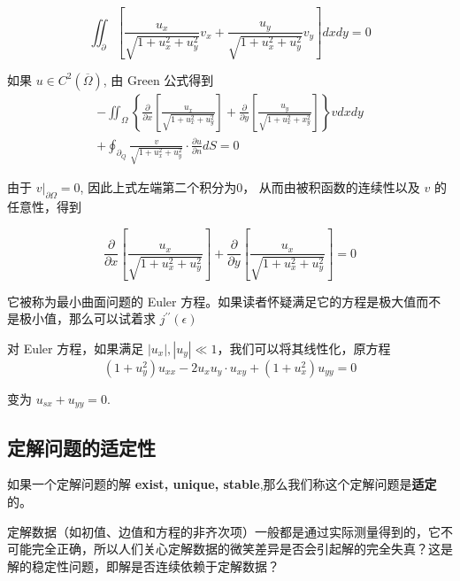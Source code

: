 \begin{equation}
	\iint_{\partial} \left[ \frac{u_{x}}{\sqrt{1+u_{x}^{2}+u_{y}^{2}}} v_{x}+\frac{u_{y}}{\sqrt{1+u_{x}^{2}+u_{y}^{2}}} v_{y}\right] d x d y=0
\end{equation}


如果 $u\in C^2 (\overline{\Omega})$, 由 Green 公式得到
\begin{equation}
\begin{array}{l}{-\iint_{\Omega}\left\{\frac{\partial}{\partial x}\left[\frac{u_{x}}{\sqrt{1+u_{x}^{2}+u_{y}^{2}}}\right]+\frac{\partial}{\partial y}\left[\frac{u_{y}}{\sqrt{1+u_{x}^{2}+x_{y}^{2}}}\right]\right\} v d x d y} \\ {+\oint_{\partial_{Q}} \frac{v}{\sqrt{1+u_{x}^{2}+u_{y}^{2}}} \cdot \frac{\partial u}{\partial n} d S=0}\end{array}
\end{equation}

由于 $v|_{\partial \Omega}=0$, 因此上式左端第二个积分为0， 从而由被积函数的连续性以及 $v$ 的任意性，得到

\begin{equation}
	\frac{\partial}{\partial x}\left[\frac{u_{x}}{\sqrt{1+u_{x}^{2}+u_{y}^{2}}}\right]+\frac{\partial}{\partial y}\left[\frac{u_{x}}{\sqrt{1+u_{x}^{2}+u_{y}^{2}}}\right]=0
\end{equation}

它被称为最小曲面问题的 Euler 方程。如果读者怀疑满足它的方程是极大值而不是极小值，那么可以试着求 $j^{\prime\prime}(\epsilon)$

对 Euler 方程，如果满足 $\left|u_{x}\right|,\left|u_{y}\right| \ll 1$，我们可以将其线性化，原方程
\begin{equation}
	\left(1+u_{y}^{2}\right) u_{x x}-2 u_{x} u_{y} \cdot u_{x y}+\left(1+u_{x}^{2}\right) u_{y y}=0
\end{equation}

变为 $u_{s x}+u_{y y}=0$.




\subsection{定解问题的适定性}

如果一个定解问题的解 \textbf{exist, unique, stable},那么我们称这个定解问题是\textbf{适定} 的。

定解数据（如初值、边值和方程的非齐次项）一般都是通过实际测量得到的，它不可能完全正确，所以人们关心定解数据的微笑差异是否会引起解的完全失真？这是解的稳定性问题，即解是否连续依赖于定解数据？

